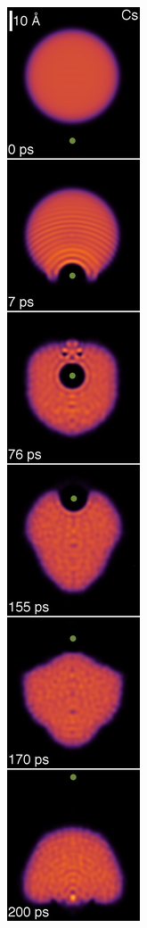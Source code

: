 \documentclass[portrait,a0paper,fontscale=0.277]{baposter}
\begin{document}
\begin{poster}
{{\begin{center}
\hspace{5px}
\includegraphics[width=0.410\linewidth]{Cs-vertical}
\end{center}

}}
\end{poster}
\end{document}
